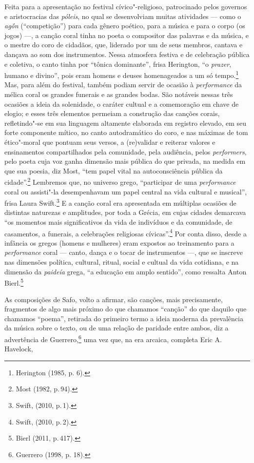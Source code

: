 Feita para a apresentação no festival cívico"-religioso, patrocinado
pelos governos e aristocracias das \textit{póleis}, no qual se
desenvolviam muitas atividades --- como o \textit{agṓn} (“competição”)
para cada gênero poético, para a música e para o corpo (os jogos) \mbox{---,} a canção coral tinha no poeta o compositor das palavras e
da música, e o mestre do coro de cidadãos, que, liderado por um de seus
membros, cantava e dançava ao som dos instrumentos.
Nessa atmosfera festiva e de celebração pública e coletiva, o canto tinha por
“tônica dominante”, frisa Herington, “o \textit{prazer}, humano e
divino”, pois eram homens e deuses homenageados a um só tempo.\footnote{ Herington (1985, p. 6).} Mas, para além
do festival, também podiam servir de ocasião à
\textit{performance} da mélica coral os grandes funerais e as grandes bodas.
São notáveis nessas três ocasiões a ideia da
solenidade, o caráter cultual e a comemoração em chave de elogio; e esses
três elementos permeiam a construção das canções corais, refletindo"-se
em sua linguagem altamente elaborada em registro elevado, em seu forte
componente mítico, no canto autodramático do coro, e nas máximas de tom
ético"-moral que pontuam seus versos, a (re)validar e reiterar valores e
ensinamentos compartilhados pela comunidade, pela audiência, pelos
\textit{performers}, pelo poeta cuja voz ganha dimensão mais
pública do que privada, na medida em que sua poesia, diz Most,
“tem papel vital na autoconsciência pública da cidade”.\footnote{Most (1982, p.\,94).}
Lembremos que, no universo grego, “participar de uma \textit{performance} coral ou assisti"-la desempenhavam um papel central na vida cultural e musical”, frisa Laura Swift.\footnote{Swift, (2010, p.\,1).} E a canção coral era apresentada em múltiplas ocasiões de distintas naturezas e amplitudes, por toda a Grécia, em cujas cidades demarcava “os momentos mais significativos da vida de indivíduos e da comunidade, de casamentos, a funerais, a celebrações religiosas cívicas”.\footnote{Swift, (2010, p.\,2).} Por conta disso, desde a infância os gregos (homens e mulheres) eram expostos ao treinamento para a \textit{performance} coral --- canto, dança e o tocar de instrumentos ---, que se inscreve nas dimensões política, cultural, ritual, social e cultual da vida cotidiana, e na dimensão da \textit{paideía} grega, “a educação em amplo sentido”, como ressalta Anton Bierl.\footnote{Bierl (2011, p.\,417).}

As composições de Safo, volto a afirmar, são canções, mais
precisamente, fragmentos de algo mais próximo do que chamamos “canção” do que
daquilo que chamamos “poema”, retirada do primeiro termo a ideia moderna da
prevalência da música sobre o texto, ou de uma relação de paridade entre ambos,
diz a advertência de Guerrero,\footnote{ Guerrero (1998, p. 18).} uma vez que, na era arcaica,
completa Eric A. Havelock, 

